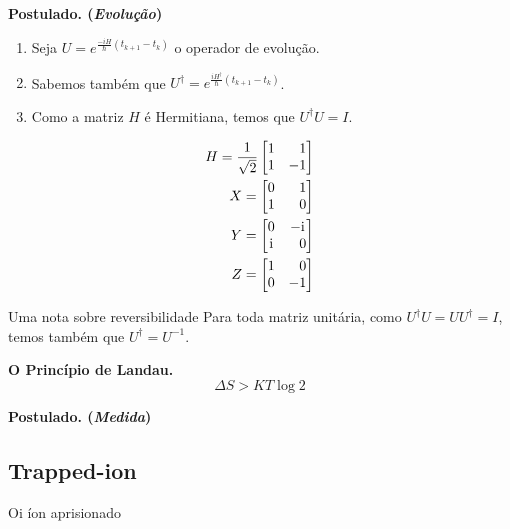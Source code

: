 \documentclass[t]{beamer}
\newcommand{\ii}{
	\rm{i}
}
\newcommand{\postulado}[1]{%
	\textbf{Postulado. (\emph{#1})\\}
}
\newcommand{\matriz}[4]{\ensuremath{
\left[\begin{matrix}
#1 & #2 \\
#3 & #4 
\end{matrix}\right]
}
}
\newcommand{\ps}{
	\phantom{-}
}
\newcommand{\HH}{\ensuremath{
	\frac{1}{\sqrt{2}}\matriz{1}{\ps 1}{1}{-1}
}}
\newcommand{\XX}{\ensuremath{
	\matriz{0}{\ps 1}{1}{\ps 0}
}}
\newcommand{\YY}{\ensuremath{
	\matriz{0}{-\ii}{\ii}{\ps 0}
}}
\newcommand{\ZZ}{\ensuremath{
	\matriz{1}{\ps 0}{0}{-1}
}}
\begin{document}
	\begin{frame}{\subsecname}
		\postulado{Evolução}
		\begin{enumerate}
			\item<1-> Seja $U = e^{\frac{-i H}{\hslash} (t_{k+1} - t_k)}$ o operador de evolução.
			\item<2-> Sabemos também que $U^{\dagger} = e^{\frac{i H^{\dagger}}{\hslash} (t_{k+1} - t_k)}$.
			\item<3-> Como a matriz $H$ é Hermitiana, temos que $U^{\dagger} U = I$.
		\end{enumerate}
		
	 \bigskip

	\vspace{1 cm}
	
	
	\end{frame}
	
	\begin{frame}{\subsecname}
		\begin{align*}
			H = \HH\\
			X = \XX\\
			Y = \YY\\
			Z = \ZZ
		\end{align*}
	
	\end{frame}
	
	\begin{frame}{Uma nota sobre reversibilidade}
		Para toda matriz unitária, como $U^{\dagger} U = U U^{\dagger} = I$, temos também que $U^\dagger = U^{-1}$.
	
		\textbf{O Princípio de Landau.}\\
		
		$$\Delta S > K T \log 2$$
		
	\end{frame}	
	
	\begin{frame}{\subsecname}
		\postulado{Medida}
	\end{frame}
	
	\subsection{Trapped-ion}
	\begin{frame}{\subsecname}
		Oi íon aprisionado
	\end{frame}
\end{document}
